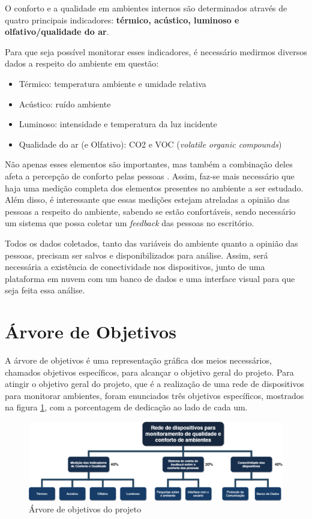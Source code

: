 \documentclass[]{politex}
\begin{document}
O conforto e a qualidade em ambientes internos são determinados através de quatro principais indicadores: \textbf{térmico, acústico, luminoso e olfativo/qualidade do ar}\cite{ComfortBox}. 

Para que seja possível monitorar esses indicadores, é necessário medirmos diversos dados a respeito do ambiente em questão: %
\begin{itemize}
\item Térmico: temperatura ambiente e umidade relativa
\item Acústico: ruído ambiente
\item Luminoso: intensidade e temperatura da luz incidente
\item Qualidade do ar (e Olfativo): CO2 e VOC (\textit{volatile organic compounds})
\end{itemize}

Não apenas esses elementos são importantes, mas também a combinação deles afeta a percepção de conforto pelas pessoas \cite{ComfortOffice}. Assim, faz-se mais necessário que haja uma medição completa dos elementos presentes no ambiente a ser estudado. Além disso, é interessante que essas medições estejam atreladas a opinião das pessoas a respeito do ambiente, sabendo se estão confortáveis, sendo necessário um sistema que possa coletar um \textit{feedback} das pessoas no escritório. 

Todos os dados coletados, tanto das variáveis do ambiente quanto a opinião das pessoas, precisam ser salvos e disponibilizados para análise. Assim, será necessária a existência de conectividade nos dispositivos, junto de uma plataforma em nuvem com um banco de dados e uma interface visual para que seja feita essa análise. 

\section{Árvore de Objetivos} 
A árvore de objetivos é uma representação gráfica dos meios necessários, chamados objetivos específicos, para alcançar o objetivo geral do projeto. Para atingir o objetivo geral do projeto, que é a realização de uma rede de dispositivos para monitorar ambientes, foram enunciados três objetivos específicos, mostrados na figura \ref{fig:objective-tree}, com a porcentagem de dedicação ao lado de cada um.

\begin{figure}[h!]
\includegraphics[width=\textwidth]{objective-tree-2}
\caption{Árvore de objetivos do projeto}
\label{fig:objective-tree}
\end{figure}
\end{document}
